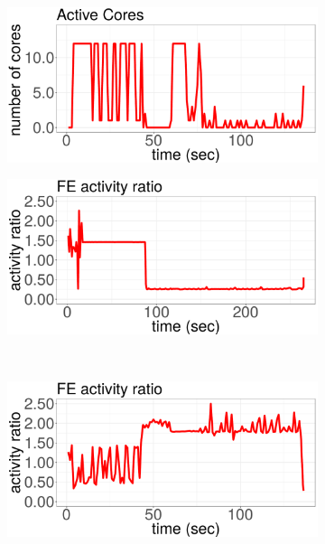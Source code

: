 \begin{figure}[p]
\begin{subfigure}[b]{.48\textwidth}
  \end{subfigure}%
~
	\begin{subfigure}[b]{.48\textwidth}
  	\includegraphics[width=\textwidth]{power_aware_job_scheduling/figures/activity_ratios/bodytrack_CORES}
  \end{subfigure}%
	\vspace{0.1cm}
	\begin{subfigure}[b]{.48\textwidth}
  	\includegraphics[width=\textwidth]{power_aware_job_scheduling/figures/activity_ratios/blackscholes_IPC}
  \end{subfigure}%
~
	\begin{subfigure}[b]{.48\textwidth}
  	\includegraphics[width=\textwidth]{power_aware_job_scheduling/figures/activity_ratios/bodytrack_IPC}

\end{subfigure}
\end{figure}
